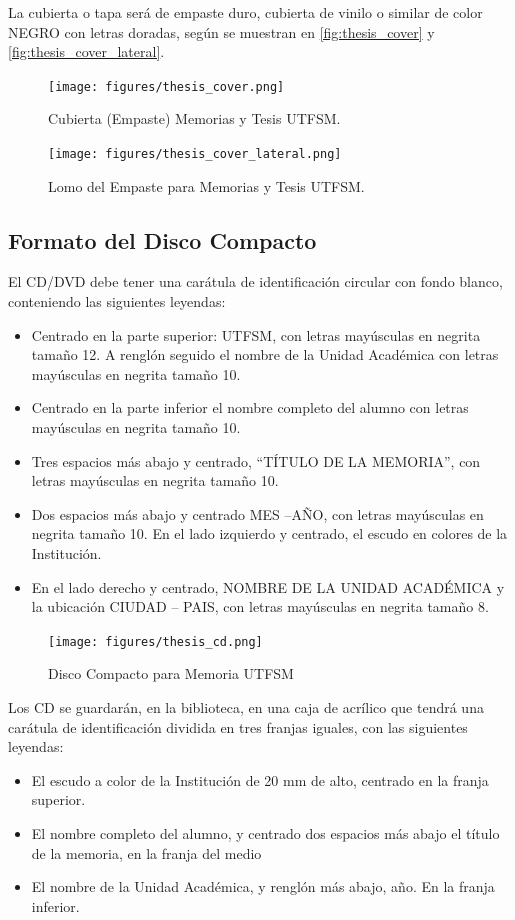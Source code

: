 La cubierta o tapa será de empaste duro, cubierta de vinilo o similar de color NEGRO con letras doradas, según se muestran en \autoref{fig:thesis_cover} y \autoref{fig:thesis_cover_lateral}.

\begin{figure}[ht!]
\centering
\texttt{[image: figures/thesis\_cover.png]}
\caption{Cubierta (Empaste) Memorias y Tesis UTFSM.}
\label{fig:thesis_cover}
\end{figure}

\begin{figure}[ht!]
\centering
\texttt{[image: figures/thesis\_cover\_lateral.png]}
\caption{Lomo del Empaste para Memorias y Tesis UTFSM.}
\label{fig:thesis_cover_lateral}
\end{figure}

\subsection{Formato del Disco Compacto}

El CD/DVD debe tener una carátula de identificación circular con fondo blanco, conteniendo las siguientes leyendas:

\begin{itemize}
		\item
    Centrado en la parte superior: UTFSM, con letras mayúsculas en negrita tamaño 12. A renglón seguido el nombre de la Unidad Académica con letras mayúsculas en negrita tamaño 10.
		\item
    Centrado en la parte inferior el nombre completo del alumno con letras mayúsculas en negrita tamaño 10.
		\item
    Tres espacios más abajo y centrado, “TÍTULO DE LA MEMORIA”, con letras mayúsculas en negrita tamaño 10.
		\item
    Dos espacios más abajo y centrado MES –AÑO, con letras mayúsculas en negrita tamaño 10.
    En el lado izquierdo y centrado, el escudo en colores de la Institución.
		\item
    En el lado derecho y centrado, NOMBRE DE LA UNIDAD ACADÉMICA y la ubicación CIUDAD – PAIS, con letras mayúsculas en negrita tamaño 8.
\end{itemize}

\begin{figure}[ht!]
\centering
\texttt{[image: figures/thesis\_cd.png]}
\caption{Disco Compacto para Memoria UTFSM}
\label{fig:thesis_cd}
\end{figure}


Los CD se guardarán, en la biblioteca, en una caja de acrílico que tendrá una carátula de identificación dividida en tres franjas iguales, con las siguientes leyendas:
\begin{itemize}
		\item
    El escudo a color de la Institución de 20 mm de alto, centrado en la franja superior.
		\item
    El nombre completo del alumno, y centrado dos espacios más abajo el título de la memoria, en la franja del medio
		\item
    El nombre de la Unidad Académica, y renglón más abajo, año. En la franja inferior.
\end{itemize}


